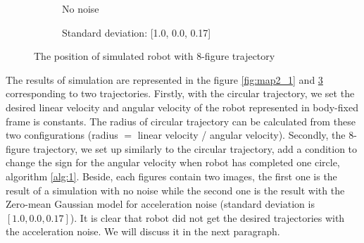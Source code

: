 \documentclass[letterpaper,12pt]{article}
\begin{document}
\begin{figure}[H]
    \centering
    \begin{subfigure}[b]{6.5cm}
        \centering
        \captionsetup{justification=centering}
        \caption{No noise}
        \label{fig:kermit}
    \end{subfigure}
    \begin{subfigure}[b]{6.5cm}
        \centering
        \captionsetup{justification=centering}
        \caption{Standard deviation: [1.0, 0.0, 0.17]}
        \label{fig:rana}
    \end{subfigure}
\caption{The position of simulated robot with 8-figure trajectory}
\label{fig:map2_2}
\end{figure}
\noindent
The results of simulation are represented in the figure \ref{fig:map2_1} and \ref{fig:map2_2} corresponding to two trajectories. Firstly, with the circular trajectory, we set the desired linear velocity and angular velocity of the robot represented in body-fixed frame is constants. The radius of circular trajectory can be calculated from these two configurations (radius $=$ linear velocity / angular velocity). Secondly, the 8-figure trajectory, we set up similarly to the circular trajectory, add a condition to change the sign for the angular velocity when robot has completed one circle, algorithm \ref{alg:1}. Beside, each figures contain two images, the first one is the result of a simulation with no noise while the second one is the result with the Zero-mean Gaussian model for acceleration noise (standard deviation is $[1.0, 0.0, 0.17]$). It is clear that robot did not get the desired trajectories with the acceleration noise. We will discuss it in the next paragraph.
\end{document}
